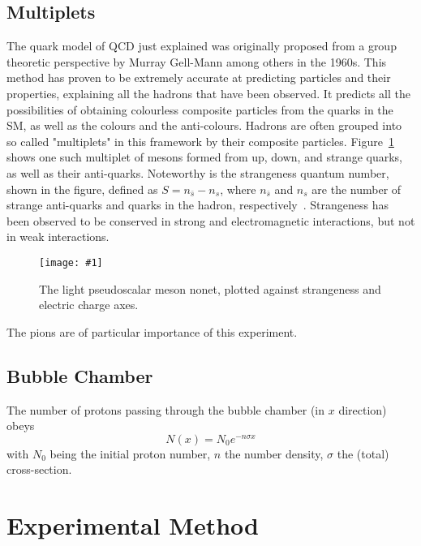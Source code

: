 \documentclass[twocolumn]{article}
\newcommand{\insertFigure}[1]{%
   \texttt{[image: \#1]}%
}
\begin{document}
\subsection{Multiplets}
The quark model of QCD just explained was originally proposed from a group theoretic perspective by Murray Gell-Mann among others in the 1960s. This method has proven to be extremely accurate at predicting particles and their properties, explaining all the hadrons that have been observed. It predicts all the possibilities of obtaining colourless composite particles from the quarks in the SM, as well as the colours and the anti-colours. Hadrons are often grouped into so called "multiplets" in this framework by their composite particles. Figure~\ref{fig:pseudo} shows one such multiplet of mesons formed from up, down, and strange quarks, as well as their anti-quarks. Noteworthy is the strangeness quantum number, shown in the figure, defined as $S = n_{\bar{s}} - n_s$, where $n_{\bar{s}}$ and $n_s$ are the number of strange anti-quarks and quarks in the hadron, respectively~\cite{Thompson}. Strangeness has been observed to be conserved in strong and electromagnetic interactions, but not in weak interactions.
\begin{figure}[!h]
	\centering
	\insertFigure{pseudo.png}
	\caption{The light pseudoscalar meson nonet, plotted against strangeness and electric charge axes.~\cite{pseudo}}
	\label{fig:pseudo}
\end{figure}
The pions are of particular importance of this experiment.


\subsection{Bubble Chamber}


\iffalse
\begin{figure}[!h]
\centering
\caption{A sample figure}
\label{fig:example}
\end{figure}
\fi
The number of protons passing through the bubble chamber (in $x$ direction) obeys
\begin{equation}
N(x) = N_0 e^{-n \sigma x}
\end{equation}
with $N_0$ being the initial proton number, $n$ the number density, $\sigma$ the (total) cross-section.
\section{Experimental Method} \label{sec:Exp}
\end{document}
